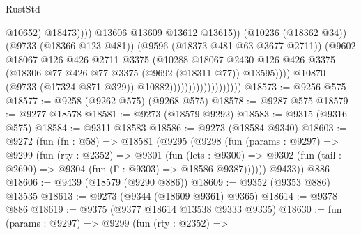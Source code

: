 \begin{lexlean}{RustStd}
\begin{coremodule}
{\begin{coremodule}
{{{{{{{{{{{{{{{{{{{{{{{{{{{{{{{{{{{{{{{{{{{{{{{{{{{{{{{                                                          @10652)
                                                        @18473))))
                                                @13606
                                                @13609
                                                @13612
                                                @13615))
                                            (@10236 (@18362 @34))
                                            (@9733 (@18366 @123 @481))
                                            (@9596 (@18373 @481 @63 @3677 @2711))
                                            (@9602
                                              @18067
                                              @126
                                              @426
                                              @2711
                                              @3375
                                              (@10288
                                                @18067
                                                @2430
                                                @126
                                                @426
                                                @3375
                                                (@18306
                                                  @77
                                                  @426
                                                  @77
                                                  @3375
                                                  (@9692 (@18311 @77))
                                                  @13595))))
                                          @10870
                                          (@9733 (@17324 @871 @329))
                                          @10882)))))))))))))))))))
@18573 := @9256 @575
@18577 := @9258 (@9262 @575) (@9268 @575)
@18578 := @9287 @575
@18579 := @9277 @18578
@18581 := @9273 (@18579 @9292)
@18583 := @9315 (@9316 @575)
@18584 := @9311 @18583
@18586 := @9273 (@18584 @9340)
@18603 := @9272
    (fun (fn : @58) =>
    @18581
      (@9295
        (@9298
          (fun (params : @9297) =>
          @9299
            (fun (rty : @2352) =>
            @9301
              (fun (lets : @9300) =>
              @9302 (fun (tail : @2690) => @9304 (fun (Γ : @9303) => @18586 @9387))))))
        @9433))
    @886
@18606 := @9439 (@18579 (@9290 @886))
@18609 := @9352 (@9353 @886) @13535
@18613 := @9273 (@9344 (@18609 @9361) @9365)
@18614 := @9378 @886
@18619 := @9375 (@9377 @18614 @13538 @9333 @9335)
@18630 := fun (params : @9297) =>
  @9299
    (fun (rty : @2352) =>
}}}}}}}}}}}}}}}}}}}}}}}}}}}}}}}}}}}}}}}}}}}}}}}}}}}}}}}
\end{coremodule}}
\end{coremodule}
\end{lexlean}
